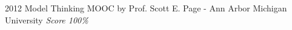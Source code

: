 \documentclass[11pt,a4paper]{moderncv}
\begin{document}
\cventry                                                                                                          %
    {2012}                                                                                                        %
    {Model Thinking}                                                                                              %
    {MOOC by Prof. Scott E. Page - Ann Arbor}                                                                     %
    {Michigan University}                                                                                         %
    {                                                                                                             %
        \textit{Score 100\%}                                                                                      %
    }                                                                                                             %
\end{document}
